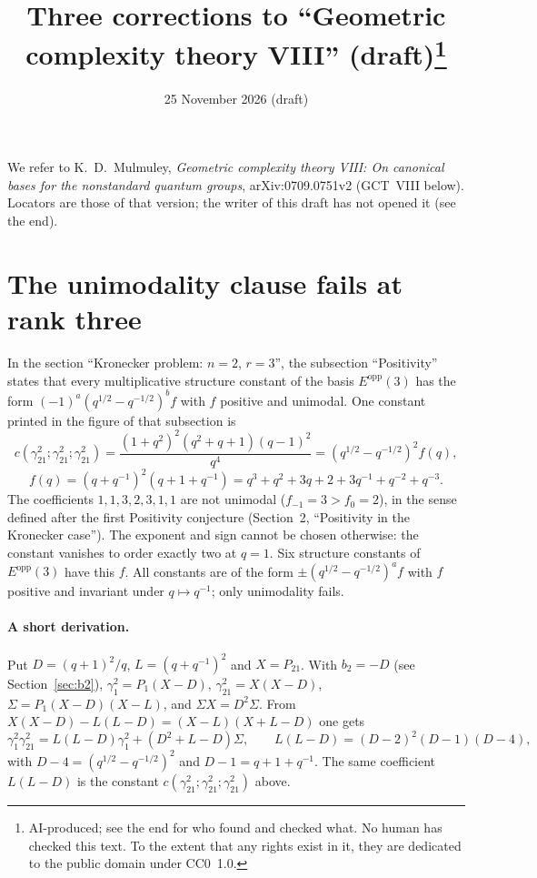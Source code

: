 \documentclass[11pt,a4paper]{article}
\title{Three corrections to ``Geometric complexity theory VIII''
(draft)\thanks{AI-produced; see the end for who found and checked what. No
human has checked this text. To the extent that any rights exist in it, they
are dedicated to the public domain under CC0~1.0.}}
\author{}
\date{25 November 2026 (draft)}
\theoremstyle{definition}
\begin{document}
\maketitle

\noindent We refer to K.~D.~Mulmuley, \emph{Geometric complexity theory VIII:
On canonical bases for the nonstandard quantum groups}, arXiv:0709.0751v2
(GCT~VIII below). Locators are those of that version; the writer of this draft
has not opened it (see the end).

\section{The unimodality clause fails at rank three}

In the section ``Kronecker problem: $n=2$, $r=3$'', the subsection
``Positivity'' states that every multiplicative structure constant of the
basis $E^{\mathrm{opp}}(3)$ has the form $(-1)^a(q^{1/2}-q^{-1/2})^bf$ with $f$
positive and unimodal. One constant printed in the figure of that subsection
is
\[
 c(\gamma^2_{21};\gamma^2_{21};\gamma^2_{21})
 =\frac{(1+q^2)^2(q^2+q+1)(q-1)^2}{q^4}
 =(q^{1/2}-q^{-1/2})^2f(q),
\]
\[
 f(q)=(q+q^{-1})^2(q+1+q^{-1})=q^3+q^2+3q+2+3q^{-1}+q^{-2}+q^{-3}.
\]
The coefficients $1,1,3,2,3,1,1$ are not unimodal ($f_{-1}=3>f_0=2$), in the
sense defined after the first Positivity conjecture (Section~2, ``Positivity in
the Kronecker case''). The exponent and sign cannot be chosen otherwise: the
constant vanishes to order exactly two at $q=1$. Six structure constants of
$E^{\mathrm{opp}}(3)$ have this $f$. All constants are of the form
$\pm(q^{1/2}-q^{-1/2})^af$ with $f$ positive and invariant under $q\mapsto
q^{-1}$; only unimodality fails.

\paragraph{A short derivation.}
Put $D=(q+1)^2/q$, $L=(q+q^{-1})^2$ and $X=P_{21}$. With $b_2=-D$ (see
Section~\ref{sec:b2}), $\gamma^2_1=P_1(X-D)$, $\gamma^2_{21}=X(X-D)$,
$\Sigma=P_1(X-D)(X-L)$, and $\Sigma X=D^2\Sigma$. From
$X(X-D)-L(L-D)=(X-L)(X+L-D)$ one gets
\[
 \gamma^2_1\gamma^2_{21}=L(L-D)\gamma^2_1+(D^2+L-D)\Sigma,\qquad
 L(L-D)=(D-2)^2(D-1)(D-4),
\]
with $D-4=(q^{1/2}-q^{-1/2})^2$ and $D-1=q+1+q^{-1}$. The same coefficient
$L(L-D)$ is the constant $c(\gamma^2_{21};\gamma^2_{21};\gamma^2_{21})$ above.
\end{document}
